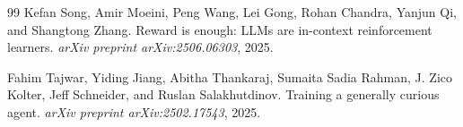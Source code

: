 \documentclass[10pt,twocolumn,letterpaper]{article}
\begin{document}
\begin{thebibliography}{99}
Kefan Song, Amir Moeini, Peng Wang, Lei Gong, Rohan Chandra, Yanjun Qi, and Shangtong Zhang.
\newblock Reward is enough: LLMs are in-context reinforcement learners.
\newblock \emph{arXiv preprint arXiv:2506.06303}, 2025.

Fahim Tajwar, Yiding Jiang, Abitha Thankaraj, Sumaita Sadia Rahman, J. Zico Kolter, Jeff Schneider, and Ruslan Salakhutdinov.
\newblock Training a generally curious agent.
\newblock \emph{arXiv preprint arXiv:2502.17543}, 2025.

\end{thebibliography}
\end{document}
